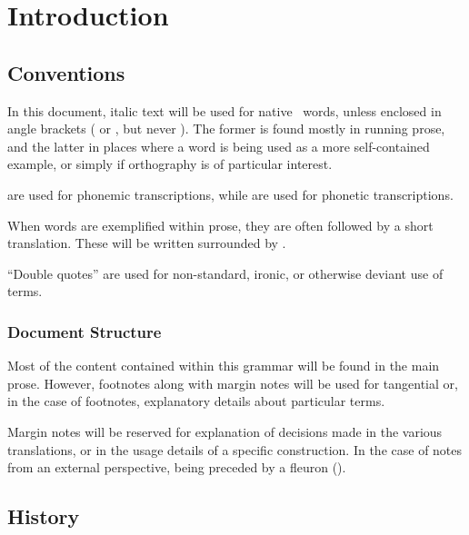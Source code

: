 \chapter{Introduction}
\section{Conventions}
In this document, italic text will be used for native \langname\ words, unless enclosed in angle brackets ( or , but never ).
The former is found mostly in running prose, and the latter in places where a word is being used as a more self-contained example, or simply if orthography is of particular interest.

 are used for phonemic transcriptions, while  are used for phonetic transcriptions.

When words are exemplified within prose, they are often followed by a short translation. These will be written surrounded by .

``Double quotes'' are used for non-standard, ironic, or otherwise deviant use of terms.

\subsection{Document Structure}
Most of the content contained within this grammar will be found in the main prose. However, footnotes along with margin notes will be used for tangential or, in the case of footnotes, explanatory details about particular terms.

Margin notes will be reserved for explanation of decisions made in the various translations, or in the usage details of a specific construction.
In the case of notes from an external perspective, being preceded by a fleuron (\fleuron).


\section{History}
